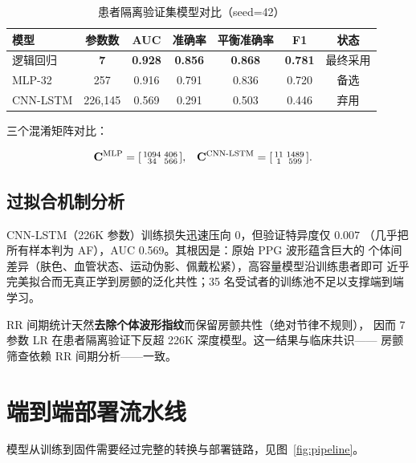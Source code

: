 \documentclass[11pt,a4paper]{ctexart}
\begin{document}
\begin{table}[htbp]
\centering
\caption{患者隔离验证集模型对比（seed=42）}
\label{tab:compare}
\begin{tabular}{lcccccc}
\toprule
模型 & 参数数 & AUC & 准确率 & 平衡准确率 & F1 & 状态 \\
\midrule
逻辑回归 & \textbf{7} & \textbf{0.928} & \textbf{0.856} & \textbf{0.868} & \textbf{0.781} & 最终采用 \\
MLP-32 & 257 & 0.916 & 0.791 & 0.836 & 0.720 & 备选 \\
CNN-LSTM & 226{,}145 & 0.569 & 0.291 & 0.503 & 0.446 & 弃用 \\
\bottomrule
\end{tabular}
\end{table}

三个混淆矩阵对比：

\begin{align}
  \mathbf{C}^{\mathrm{MLP}} &= \begin{bsmallmatrix} 1094 & 406 \\ 34 & 566 \end{bsmallmatrix}, &
  \mathbf{C}^{\mathrm{CNN\text{-}LSTM}} &= \begin{bsmallmatrix} 11 & 1489 \\ 1 & 599 \end{bsmallmatrix}.
  \label{eq:conf}
\end{align}

\subsection{过拟合机制分析}
\label{sec:overfit}

CNN-LSTM（226K 参数）训练损失迅速压向 0，但验证特异度仅 $0.007$
（几乎把所有样本判为 AF），AUC 0.569。其根因是：原始 PPG 波形蕴含巨大的
个体间差异（肤色、血管状态、运动伪影、佩戴松紧），高容量模型沿训练患者即可
近乎完美拟合而无真正学到房颤的泛化共性；35 名受试者的训练池不足以支撑端到端学习。

RR 间期统计天然\textbf{去除个体波形指纹}而保留房颤共性（绝对节律不规则），
因而 7 参数 LR 在患者隔离验证下反超 226K 深度模型。这一结果与临床共识——
房颤筛查依赖 RR 间期分析——一致。

\section{端到端部署流水线}
\label{sec:deployment}

模型从训练到固件需要经过完整的转换与部署链路，见图~\ref{fig:pipeline}。
\end{document}
